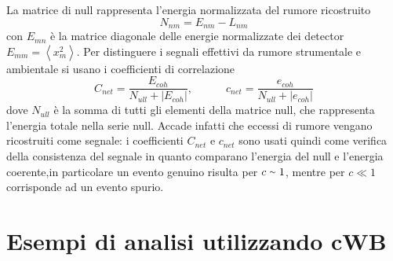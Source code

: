 La matrice di null rappresenta l'energia normalizzata del rumore ricostruito
\begin{equation}
	N_{nm} = E_{nm}-L_{nm}
\end{equation}
con $E_{mn}$  è la matrice diagonale delle energie normalizzate dei detector $E_{mm}  = \left<x_m^2\right>$. Per distinguere i segnali effettivi da rumore strumentale e ambientale si usano i coefficienti di correlazione 
\begin{equation}
	C_{net} = \frac{E_{coh}}{N_{ull}+|E_{coh}|}, \quad\quad\quad c_{net} = \frac{e_{coh}}{N_{ull}+|e_{coh}|}
\end{equation}
dove $N_{ull}$ è la somma di tutti gli elementi della matrice null, che rappresenta l'energia totale nella serie null. Accade infatti che eccessi di rumore vengano ricostruiti come segnale: i coefficienti $C_{net}$ e $c_{net}$ sono usati quindi come verifica della consistenza del segnale in quanto comparano l'energia del null e l'energia coerente\cite{Klimenko_2008},in particolare un evento genuino risulta per $c\smallsim 1$, mentre per $c \ll 1$ corrisponde ad un evento spurio\cite{Klimenko_2016}.





%
%

\section{Esempi di analisi utilizzando cWB}
\label{section:examples}


